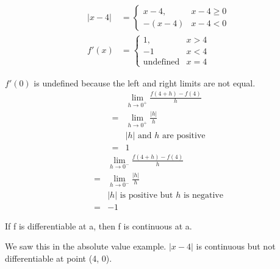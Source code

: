 \documentclass{article}
\theoremstyle{mytheoremstyle}
\theoremstyle{mytheoremstyle}
\theoremstyle{myproblemstyle}
\begin{document}
    \begin{align*}
        |x-4| &= \begin{cases}
            x-4, & x-4\ge 0\\
            -(x-4) & x-4< 0
        \end{cases} \\
        f'(x) &= \begin{cases}
            1, & x>4 \\
            -1 & x<4 \\
            \text{undefined} & x=4
        \end{cases}
    \end{align*}

    $f'(0)$ is undefined because the left and right limits are not equal.
    \begin{align*}
        &\lim_{h\to 0^+} \frac{f(4+h)-f(4)}{h} \\
        =& \lim_{h\to 0^+} \frac{|h|}{h} \\
        &\text{$|h|$ and $h$ are positive} \\
        =& 1
    \end{align*}
    \begin{align*}
        &\lim_{h\to 0^-} \frac{f(4+h)-f(4)}{h} \\
        =& \lim_{h\to 0^-} \frac{|h|}{h} \\
        &\text{$|h|$ is positive but $h$ is negative} \\
        =& -1
    \end{align*}

    \begin{theorem}
        If f is differentiable at a, then f is continuous at a.
    \end{theorem}
    We saw this in the absolute value example. $|x-4|$ is continuous
    but not differentiable at point (4, 0).
\end{document}
